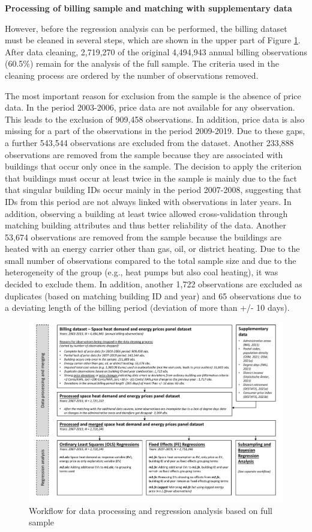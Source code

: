 \documentclass[12pt,twoside]{reedthesis}
\begin{document}
\textbf{Processing of billing sample and matching with supplementary data}

However, before the regression analysis can be performed, the billing dataset must be cleaned in several steps, which are shown in the upper part of Figure \ref{fig:workflow1}. After data cleaning, 2,719,270 of the original 4,494,943 annual billing observations (60.5\%) remain for the analysis of the full sample. The criteria used in the cleaning process are ordered by the number of observations removed.

The most important reason for exclusion from the sample is the absence of price data. In the period 2003-2006, price data are not available for any observation. This leads to the exclusion of 909,458 observations. In addition, price data is also missing for a part of the observations in the period 2009-2019. Due to these gaps, a further 543,544 observations are excluded from the dataset. Another 233,888 observations are removed from the sample because they are associated with buildings that occur only once in the sample. The decision to apply the criterion that buildings must occur at least twice in the sample is mainly due to the fact that singular building IDs occur mainly in the period 2007-2008, suggesting that IDs from this period are not always linked with observations in later years. In addition, observing a building at least twice allowed cross-validation through matching building attributes and thus better reliability of the data. Another 53,674 observations are removed from the sample because the buildings are heated with an energy carrier other than gas, oil, or district heating. Due to the small number of observations compared to the total sample size and due to the heterogeneity of the group (e.g., heat pumps but also coal heating), it was decided to exclude them. In addition, another 1,722 observations are excluded as duplicates (based on matching building ID and year) and 65 observations due to a deviating length of the billing period (deviation of more than +/- 10 days).
\begin{figure}

{\centering \includegraphics[width=1.03\linewidth]{figure/workflow_diagramm_part1} 

}

\caption{Workflow for data processing and regression analysis based on full sample}\label{fig:workflow1}
\end{figure}
\end{document}
